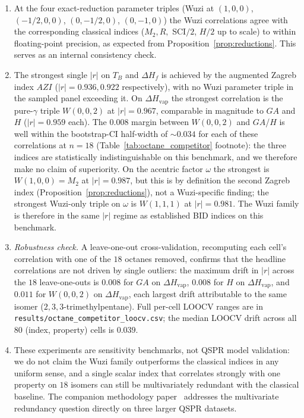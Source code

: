 \documentclass[11pt,a4paper]{article}
\theoremstyle{definition}
\begin{document}
\begin{enumerate}[label=(\alph*)]
\item At the four exact-reduction parameter triples (Wuzi at
$(1,0,0)$, $(-1/2,0,0)$, $(0,-1/2,0)$, $(0,-1,0)$) the Wuzi
correlations agree with the corresponding classical indices
($M_2, R, $ SCI$/2$, $H/2$ up to scale) to within floating-point
precision, as expected from Proposition~\ref{prop:reductions}.
This serves as an internal consistency check.

\item The strongest single $|r|$ on $T_B$ and $\Delta H_f$ is
achieved by the augmented Zagreb index $AZI$ ($|r| = 0.936, 0.922$
respectively), with no Wuzi parameter triple in the sampled panel
exceeding it. On $\Delta H_\mathrm{vap}$ the strongest correlation
is the pure-$\gamma$ triple $W(0, 0, 2)$ at $|r| = 0.967$,
comparable in magnitude to $GA$ and $H$ ($|r| = 0.959$ each).
The $0.008$ margin between $W(0, 0, 2)$ and $GA$/$H$ is well within
the bootstrap-CI half-width of $\sim 0.034$ for each of these
correlations at $n = 18$ (Table~\ref{tab:octane_competitor}
footnote): the three indices are statistically indistinguishable on
this benchmark, and we therefore make no claim of superiority. On
the acentric factor $\omega$ the strongest is $W(1, 0, 0) = M_2$
at $|r| = 0.987$, but this is by definition the second Zagreb
index (Proposition~\ref{prop:reductions}), not a Wuzi-specific
finding; the strongest Wuzi-only triple on $\omega$ is $W(1, 1, 1)$
at $|r| = 0.981$. The Wuzi family is therefore in the same $|r|$
regime as established BID indices on this benchmark.

\item \emph{Robustness check.} A leave-one-out cross-validation,
recomputing each cell's correlation with one of the $18$ octanes
removed, confirms that the headline correlations are not driven
by single outliers: the maximum drift in $|r|$ across the $18$
leave-one-outs is $0.008$ for $GA$ on $\Delta H_\mathrm{vap}$,
$0.008$ for $H$ on $\Delta H_\mathrm{vap}$, and $0.011$ for
$W(0, 0, 2)$ on $\Delta H_\mathrm{vap}$, each largest drift
attributable to the same isomer ($2, 3, 3$-trimethylpentane).
Full per-cell LOOCV ranges are in
\texttt{results/octane\_competitor\_loocv.csv}; the median LOOCV
drift across all $80$ (index, property) cells is $0.039$.

\item These experiments are sensitivity benchmarks, not QSPR model
validation: we do not claim the Wuzi family outperforms the
classical indices in any uniform sense, and a single scalar index
that correlates strongly with one property on $18$ isomers can
still be multivariately redundant with the classical baseline. The
companion methodology paper~\cite{Paper2_Screening} addresses the
multivariate redundancy question directly on three
larger QSPR datasets.
\end{enumerate}
\end{document}

